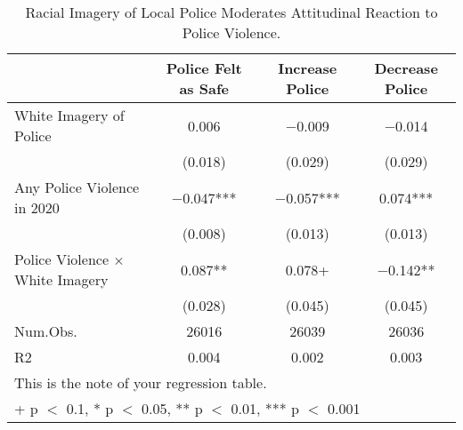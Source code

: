 \begin{table}

\caption{Racial Imagery of Local Police Moderates Attitudinal Reaction to Police Violence.}
\centering
\begin{tabular}[t]{lccc}
\toprule
  & Police Felt as Safe & Increase Police & Decrease Police\\
\midrule
White Imagery of Police & \num{0.006} & \num{-0.009} & \num{-0.014}\\
 & (\num{0.018}) & (\num{0.029}) & (\num{0.029})\\
Any Police Violence in 2020 & \num{-0.047}*** & \num{-0.057}*** & \num{0.074}***\\
 & (\num{0.008}) & (\num{0.013}) & (\num{0.013})\\
Police Violence × White Imagery & \num{0.087}** & \num{0.078}+ & \num{-0.142}**\\
 & (\num{0.028}) & (\num{0.045}) & (\num{0.045})\\
\midrule
Num.Obs. & \num{26016} & \num{26039} & \num{26036}\\
R2 & \num{0.004} & \num{0.002} & \num{0.003}\\
\bottomrule
\multicolumn{4}{l}{\rule{0pt}{1em}This is the note of your regression table.}\\
\multicolumn{4}{l}{\rule{0pt}{1em}+ p $<$ 0.1, * p $<$ 0.05, ** p $<$ 0.01, *** p $<$ 0.001}\\
\end{tabular}
\end{table}
